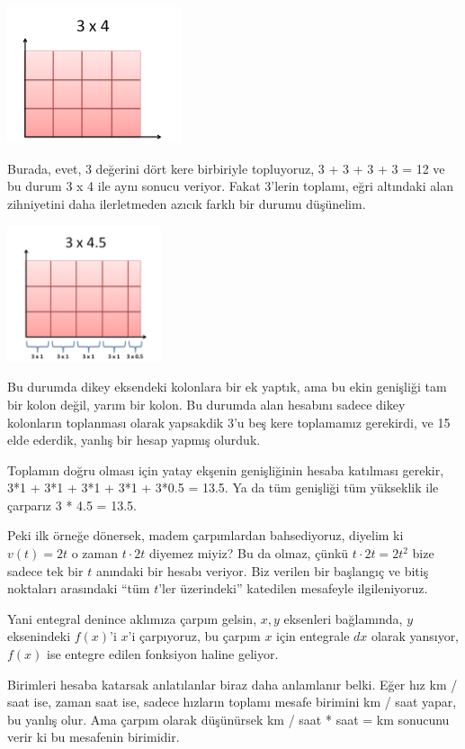 \documentclass[12pt,fleqn]{article}\usepackage{../../common}
\begin{document}
\includegraphics[height=4cm]{calc_multi_app_04.png}

Burada, evet, 3 değerini dört kere birbiriyle topluyoruz, 3 + 3 + 3 + 3 =
12 ve bu durum 3 x 4 ile aynı sonucu veriyor. Fakat 3'lerin toplamı, eğri
altındaki alan zihniyetini daha ilerletmeden azıcık farklı bir durumu
düşünelim. 

\includegraphics[height=4cm]{calc_multi_app_09.png}

Bu durumda dikey eksendeki kolonlara bir ek yaptık, ama bu ekin genişliği
tam bir kolon değil, yarım bir kolon. Bu durumda alan hesabını sadece dikey
kolonların toplanması olarak yapsakdik 3'u beş kere toplamamız gerekirdi,
ve 15 elde ederdik, yanlış bir hesap yapmış olurduk.

Toplamın doğru olması için yatay ekşenin genişliğinin hesaba katılması
gerekir, 3*1 + 3*1 + 3*1 + 3*1 + 3*0.5 = 13.5. Ya da tüm genişliği tüm
yükseklik ile çarparız 3 * 4.5 = 13.5. 

Peki ilk örneğe dönersek, madem çarpımlardan bahsediyoruz, diyelim ki
$v(t) = 2t$ o zaman $t \cdot 2t$ diyemez miyiz? Bu da olmaz, çünkü $t\cdot 2t = 2t^2$ 
bize sadece tek bir $t$ anındaki bir hesabı veriyor. Biz verilen bir 
başlangıç ve bitiş noktaları arasındaki ``tüm $t$'ler üzerindeki'' 
katedilen mesafeyle ilgileniyoruz.  

Yani entegral denince aklımıza çarpım gelsin, $x,y$ eksenleri bağlamında,
$y$ eksenindeki $f(x)$'i $x$'i çarpıyoruz, bu çarpım $x$ için entegrale
$dx$ olarak yansıyor, $f(x)$ ise entegre edilen fonksiyon haline geliyor. 

Birimleri hesaba katarsak anlatılanlar biraz daha anlamlanır belki. Eğer
hız km / saat ise, zaman saat ise, sadece hızların toplamı mesafe birimini
km / saat yapar, bu yanlış olur. Ama çarpım olarak düşünürsek km / saat *
saat = km sonucunu verir ki bu mesafenin birimidir. 
\end{document}
